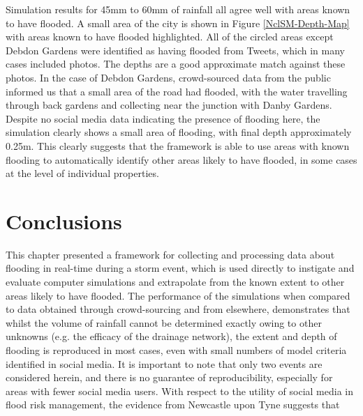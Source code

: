Simulation results for 45mm to 60mm of rainfall all agree well with areas known to have flooded. A small area of the city is shown in Figure \ref{NclSM-Depth-Map} with areas known to have flooded highlighted. All of the circled areas except Debdon Gardens were identified as having flooded from Tweets, which in many cases included photos. The depths are a good approximate match against these photos. In the case of Debdon Gardens, crowd-sourced data from the public informed us that a small area of the road had flooded, with the water travelling through back gardens and collecting near the junction with Danby Gardens. Despite no social media data indicating the presence of flooding here, the simulation clearly shows a small area of flooding, with final depth approximately 0.25m. This clearly suggests that the framework is able to use areas with known flooding to automatically identify other areas likely to have flooded, in some cases at the level of individual properties. 

\section{Conclusions}

This chapter presented a framework for collecting and processing data about flooding in real-time during a storm event, which is used directly to instigate and evaluate computer simulations and extrapolate from the known extent to other areas likely to have flooded. The performance of the simulations when compared to data obtained through crowd-sourcing and from elsewhere, demonstrates that whilst the volume of rainfall cannot be determined exactly owing to other unknowns (e.g. the efficacy of the drainage network), the extent and depth of flooding is reproduced in most cases, even with small numbers of model criteria identified in social media. It is important to note that only two events are considered herein, and there is no guarantee of reproducibility, especially for areas with fewer social media users. With respect to the utility of social media in flood risk management, the evidence from Newcastle upon Tyne suggests that

